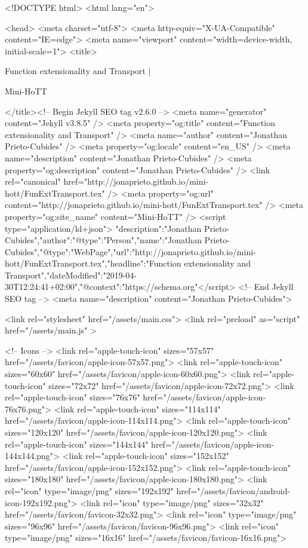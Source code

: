 <!DOCTYPE html>
<html lang="en">

<head>
  <meta charset="utf-8">
  <meta http-equiv="X-UA-Compatible" content="IE=edge">
  <meta name="viewport" content="width=device-width, initial-scale=1">
  <title>
    
      
        Function extensionality and Transport |
      
        Mini-HoTT
    
  </title><!-- Begin Jekyll SEO tag v2.6.0 -->
<meta name="generator" content="Jekyll v3.8.5" />
<meta property="og:title" content="Function extensionality and Transport" />
<meta name="author" content="Jonathan Prieto-Cubides" />
<meta property="og:locale" content="en_US" />
<meta name="description" content="Jonathan Prieto-Cubides" />
<meta property="og:description" content="Jonathan Prieto-Cubides" />
<link rel="canonical" href="http://jonaprieto.github.io/mini-hott/FunExtTransport.tex" />
<meta property="og:url" content="http://jonaprieto.github.io/mini-hott/FunExtTransport.tex" />
<meta property="og:site_name" content="Mini-HoTT" />
<script type="application/ld+json">
{"description":"Jonathan Prieto-Cubides","author":{"@type":"Person","name":"Jonathan Prieto-Cubides"},"@type":"WebPage","url":"http://jonaprieto.github.io/mini-hott/FunExtTransport.tex","headline":"Function extensionality and Transport","dateModified":"2019-04-30T12:24:41+02:00","@context":"https://schema.org"}</script>
<!-- End Jekyll SEO tag -->
<meta name="description" content="Jonathan Prieto-Cubides">

  <link rel="stylesheet" href="/assets/main.css">
  <link rel="preload" as="script" href="/assets/main.js" >

  <!-- Icons -->
  <link rel="apple-touch-icon" sizes="57x57" href="/assets/favicon/apple-icon-57x57.png">
  <link rel="apple-touch-icon" sizes="60x60" href="/assets/favicon/apple-icon-60x60.png">
  <link rel="apple-touch-icon" sizes="72x72" href="/assets/favicon/apple-icon-72x72.png">
  <link rel="apple-touch-icon" sizes="76x76" href="/assets/favicon/apple-icon-76x76.png">
  <link rel="apple-touch-icon" sizes="114x114" href="/assets/favicon/apple-icon-114x114.png">
  <link rel="apple-touch-icon" sizes="120x120" href="/assets/favicon/apple-icon-120x120.png">
  <link rel="apple-touch-icon" sizes="144x144" href="/assets/favicon/apple-icon-144x144.png">
  <link rel="apple-touch-icon" sizes="152x152" href="/assets/favicon/apple-icon-152x152.png">
  <link rel="apple-touch-icon" sizes="180x180" href="/assets/favicon/apple-icon-180x180.png">
  <link rel="icon" type="image/png" sizes="192x192"  href="/assets/favicon/android-icon-192x192.png">
  <link rel="icon" type="image/png" sizes="32x32" href="/assets/favicon/favicon-32x32.png">
  <link rel="icon" type="image/png" sizes="96x96" href="/assets/favicon/favicon-96x96.png">
  <link rel="icon" type="image/png" sizes="16x16" href="/assets/favicon/favicon-16x16.png">

